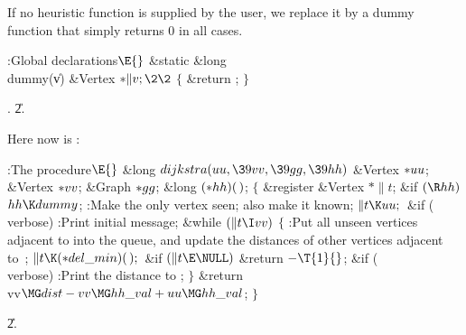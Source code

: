 If no heuristic function is supplied by the user, we replace it by a
dummy function that simply returns 0 in all cases.

\Y\B\4:Global declarations\X${}\E{}$\6
\1\1\&{static} \&{long} \\{dummy}(\|v)\6
\&{Vertex} ${}{*}\|v;\2\2{}$\6
${}\{{}$\5
\1\&{return} ;\5
${}\}{}$\2\par
{}.
\U2.\fi

Here now is :

\Y\B\4:The  procedure\X${}\E{}$\6
\1\1\&{long} ${}\\{dijkstra}(\\{uu},\39\\{vv},\39\\{gg},\39\\{hh}){}$\6
\&{Vertex} ${}{*}\\{uu}{}$;\6
\&{Vertex} ${}{*}\\{vv}{}$;\6
\&{Graph} ${}{*}\\{gg}{}$;\6
\&{long} ${}({*}\\{hh})(\,){}$;\2\2\6
${}\{{}$\5
\1\&{register} \&{Vertex} ${}{*}\|t{}$;\7
\&{if} ${}(\R\\{hh}){}$\1\5
${}\\{hh}\K\\{dummy}{}$;\2\6
:Make  the only vertex seen; also make it known\X;\6
${}\|t\K\\{uu};{}$\6
\&{if} (\\{verbose})\1\5
:Print initial message\X;\2\6
\&{while} ${}(\|t\I\\{vv}){}$\5
${}\{{}$\1\6
:Put all unseen vertices adjacent to  into the queue, and update
the distances of other vertices adjacent to~\X;\6
${}\|t\K({*}\\{del\_min})(\,);{}$\6
\&{if} ${}(\|t\E\NULL){}$\1\5
\&{return} ${}{-}\T{1}{}$;\2\6
\&{if} (\\{verbose})\1\5
:Print the distance to \X;\2\6
\4${}\}{}$\2\6
\&{return} \\{vv}${}\MG\\{dist}-\\{vv}\MG\\{hh\_val}+\\{uu}\MG\\{hh\_val}{}$;%
\6
\4${}\}{}$\2\par
\U2.\fi

